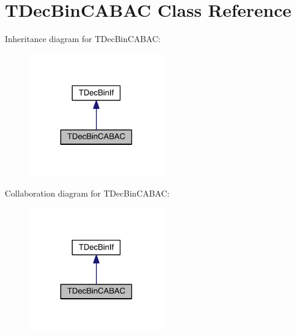 \hypertarget{class_t_dec_bin_c_a_b_a_c}{}\section{T\+Dec\+Bin\+C\+A\+B\+AC Class Reference}
\label{class_t_dec_bin_c_a_b_a_c}


Inheritance diagram for T\+Dec\+Bin\+C\+A\+B\+AC\+:
\nopagebreak
\begin{figure}[H]
\begin{center}
\leavevmode
\includegraphics[width=169pt]{d2/d4f/class_t_dec_bin_c_a_b_a_c__inherit__graph}
\end{center}
\end{figure}


Collaboration diagram for T\+Dec\+Bin\+C\+A\+B\+AC\+:
\nopagebreak
\begin{figure}[H]
\begin{center}
\leavevmode
\includegraphics[width=169pt]{d8/d1c/class_t_dec_bin_c_a_b_a_c__coll__graph}
\end{center}
\end{figure}
